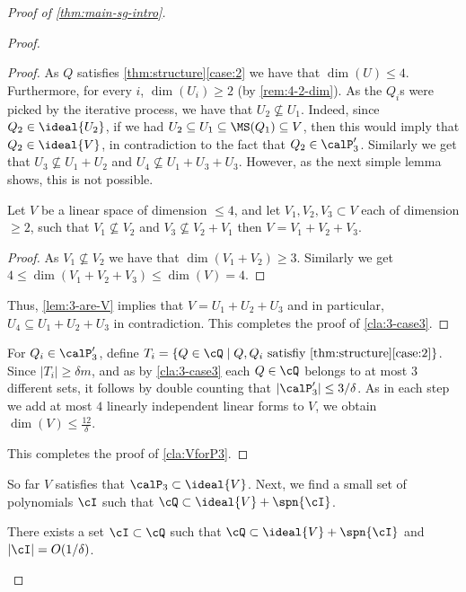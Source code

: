 \begin{proof}[Proof of \autoref{thm:main-sg-intro}]
\begin{proof}
\begin{proof}
As $Q$ satisfies \autoref{thm:structure}\ref{case:2} we have that  $\dim(U) \leq 4$. Furthermore, for every $i$, $\dim(U_i)\geq 2$ (by \autoref{rem:4-2-dim}). As the $Q_i$s were picked by the iterative process, we have that $U_2 \not \subseteq U_1$. Indeed, since $Q_2 \in \ideal{U_2}$, if we had $U_2 \subseteq U_1\subseteq  \MS(Q_1)\subseteq V$, then this would imply that $Q_2\in\ideal{V}$, in contradiction to the fact that $Q_2\in \calP'_3$. Similarly we get that
$U_3 \not \subseteq U_1 + U_2$ and  $U_4 \not \subseteq U_1+U_3 +U_3$. However, as the next simple lemma shows, this is not possible.
\begin{lemma} \label{lem:3-are-V}
Let $V$ be a linear space of dimension $\leq 4$, and let $V_1,V_2,V_3 \subset V$ each of dimension $\geq 2$, such that $V_1\not \subseteq V_2$ and  $V_3\not \subseteq V_2 + V_1$ then $V = V_1+V_2+V_3$.
\end{lemma}
\begin{proof}
As $V_1\not \subseteq V_2$ we have that $\dim(V_1+V_2)\geq 3$. Similarly we get 
$4\leq \dim(V_1+V_2+V_3)\leq \dim(V)=4$.
\end{proof}
Thus, \autoref{lem:3-are-V} implies that $V=U_1+U_2+U_3$ and in particular, $U_4 \subseteq U_1+U_2+U_3$ in contradiction. This completes the proof of \autoref{cla:3-case3}.
\end{proof}

For $Q_i \in \calP'_3$, define $T_i =\{Q\in \cQ \mid Q,Q_i \text{ satisfiy \autoref{thm:structure}\ref{case:2}}\}$. Since $|T_{i}|\geq \delta m$, and as by \autoref{cla:3-case3} each $Q\in \cQ$ belongs to at most $3$ different sets, it follows by double counting that  $|\calP'_3|\leq 3/\delta$.
As in each step we add at most $4$ linearly independent linear forms to $V$, we obtain $\dim(V)\leq \frac{12}{\delta}$.

This completes the proof of \autoref{cla:VforP3}.
\end{proof}

So far $V$ satisfies that $\calP_3 \subset \ideal{V}$. Next, we find a small set of polynomials $\cI$ such that $\cQ \subset \ideal{V}+\spn{\cI}$. 



\begin{claim}\label{cla:Iexists}
There exists a set $\cI\subset \cQ$ such that $\cQ \subset \ideal{V}+\spn{\cI}$ and $|\cI|= O(1/\delta) $. 
\end{claim}


\end{proof}
